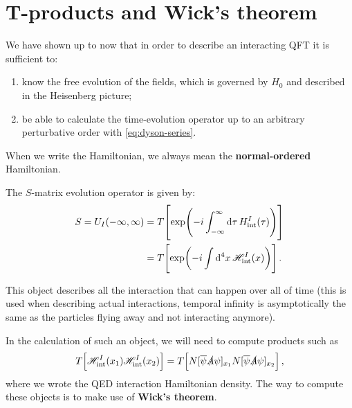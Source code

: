 \documentclass[main.tex]{subfiles}
\begin{document}
\section{T-products and Wick's theorem}


We have shown up to now that in order to describe an interacting QFT it is sufficient to: 
\begin{enumerate}
    \item know the free evolution of the fields, which is governed by \(H_0 \) and described in the Heisenberg picture;
    \item be able to calculate the time-evolution operator up to an arbitrary perturbative order with \eqref{eq:dyson-series}. 
\end{enumerate}

When we write the Hamiltonian, we always mean the \textbf{normal-ordered} Hamiltonian. 

\begin{definition}
The \(S\)-matrix evolution operator is given by:
%
\begin{subequations}
\begin{align}
S = U_I (- \infty , \infty )
&= T \qty[\exp(-i \int_{- \infty }^{\infty } \dd{\tau }H _{\text{int}}^{I} (\tau ))]  \\
&= T \qty[\exp(-i \int \dd[4]{x} \mathscr{H} _{\text{int}}^{I} (x))]
\,.
\end{align}
\end{subequations}
\end{definition}

This object describes all the interaction that can happen over all of time (this is used when describing actual interactions, temporal infinity is asymptotically the same as the particles flying away and not interacting anymore).

In the calculation of such an object, we will need to compute products such as 
%
\begin{align}
T \qty[\mathscr{H} _{\text{int}}^{I}(x_1 ) \mathscr{H} _{\text{int}}^{I}(x_2 )] 
= T \qty[ N[\overline{\psi} \slashed{A} \psi ]_{x_1 }N[\overline{\psi} \slashed{A} \psi ]_{x_2 }]
\,,
\end{align}
%
where we wrote the QED interaction Hamiltonian density. The way to compute these objects is to make use of \textbf{Wick's theorem}. 
\end{document}

